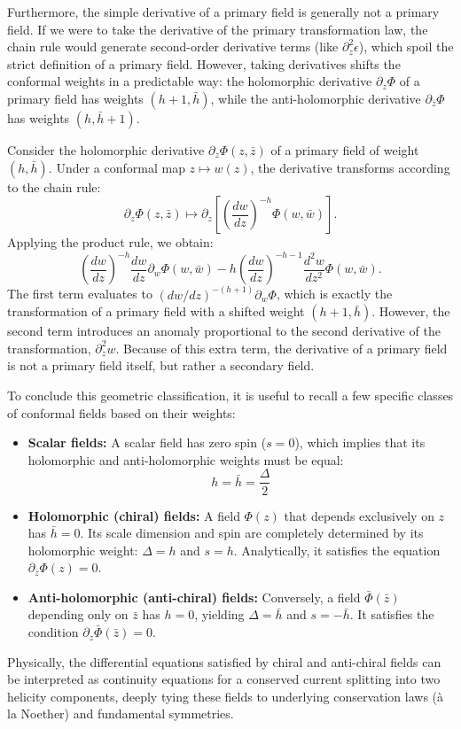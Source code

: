 Furthermore, the simple derivative of a primary field is generally not a primary field. If we were to take the derivative of the primary transformation law, the chain rule would generate second-order derivative terms (like \(\partial^2_z \epsilon\)), which spoil the strict definition of a primary field. However, taking derivatives shifts the conformal weights in a predictable way: the holomorphic derivative \(\partial_z \Phi\) of a primary field has weights \((h+1, \bar{h})\), while the anti-holomorphic derivative \(\partial_{\bar{z}} \Phi\) has weights \((h, \bar{h}+1)\).

\begin{example}
    Consider the holomorphic derivative \(\partial_z \Phi(z, \bar{z})\) of a primary field of weight \((h, \bar{h})\). Under a conformal map \(z \mapsto w(z)\), the derivative transforms according to the chain rule:
    \[
        \partial_z \Phi(z, \bar{z}) \mapsto \partial_z \left[ \left( \frac{dw}{dz} \right)^{-h} \Phi(w, \bar{w}) \right].
    \]
    Applying the product rule, we obtain:
    \[
        \left( \frac{dw}{dz} \right)^{-h} \frac{dw}{dz} \partial_w \Phi(w, \bar{w}) - h \left( \frac{dw}{dz} \right)^{-h-1} \frac{d^2w}{dz^2} \Phi(w, \bar{w}).
    \]
    The first term evaluates to \((dw/dz)^{-(h+1)} \partial_w \Phi\), which is exactly the transformation of a primary field with a shifted weight \((h+1, \bar{h})\). However, the second term introduces an anomaly proportional to the second derivative of the transformation, \(\partial^2_z w\). Because of this extra term, the derivative of a primary field is not a primary field itself, but rather a secondary field.
\end{example}

To conclude this geometric classification, it is useful to recall a few specific classes of conformal fields based on their weights:
\begin{itemize}
    \item \textbf{Scalar fields:} A scalar field has zero spin (\(s=0\)), which implies that its holomorphic and anti-holomorphic weights must be equal:
          \[
              h = \bar{h} = \frac{\Delta}{2}
          \]
    \item \textbf{Holomorphic (chiral) fields:} A field \(\Phi(z)\) that depends exclusively on \(z\) has \(\bar{h} = 0\). Its scale dimension and spin are completely determined by its holomorphic weight: \(\Delta = h\) and \(s = h\). Analytically, it satisfies the equation \(\partial_{\bar{z}} \Phi(z) = 0\).
    \item \textbf{Anti-holomorphic (anti-chiral) fields:} Conversely, a field \(\bar{\Phi}(\bar{z})\) depending only on \(\bar{z}\) has \(h = 0\), yielding \(\Delta = \bar{h}\) and \(s = -\bar{h}\). It satisfies the condition \(\partial_z \bar{\Phi}(\bar{z}) = 0\).
\end{itemize}
Physically, the differential equations satisfied by chiral and anti-chiral fields can be interpreted as continuity equations for a conserved current splitting into two helicity components, deeply tying these fields to underlying conservation laws (à la Noether) and fundamental symmetries.

